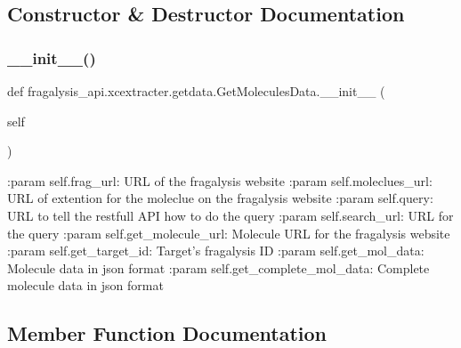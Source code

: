 \subsection{Constructor \& Destructor Documentation}
\mbox{\label{classfragalysis__api_1_1xcextracter_1_1getdata_1_1_get_molecules_data_a11e4a33bfbb0ff558ef33a0e8a46c76b}} 
\subsubsection{\texorpdfstring{\+\_\+\+\_\+init\+\_\+\+\_\+()}{\_\_init\_\_()}}
{\footnotesize\ttfamily def fragalysis\+\_\+api.\+xcextracter.\+getdata.\+Get\+Molecules\+Data.\+\_\+\+\_\+init\+\_\+\+\_\+ (\begin{DoxyParamCaption}\item[{}]{self }\end{DoxyParamCaption})}

\begin{DoxyVerb}:param self.frag_url: URL of the fragalysis website
:param self.moleclues_url: URL of extention for the moleclue on the fragalysis website
:param self.query: URL to tell the restfull API how to do the query
:param self.search_url: URL for the query 
:param self.get_molecule_url: Molecule URL for the fragalysis website
:param self.get_target_id: Target's fragalysis ID 
:param self.get_mol_data: Molecule data in json format
:param self.get_complete_mol_data: Complete molecule data in json format
\end{DoxyVerb}
 

\subsection{Member Function Documentation}
\mbox{\label{classfragalysis__api_1_1xcextracter_1_1getdata_1_1_get_molecules_data_a5bf2f4562196e169f76aa30cdcd9029d}} 
